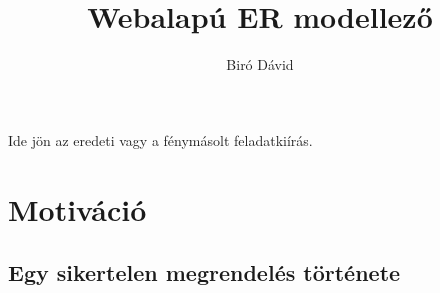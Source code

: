 \documentclass[a4paper,12pt,oneside]{report}
\title{Webalapú ER modellező}
\author{Biró Dávid}
\date{}
\begin{document}
\setcounter{chapter}{1}

\pagestyle{empty}

\newpage

\newpage
Ide jön az eredeti vagy a fénymásolt feladatkiírás.
\newpage

\newpage

\newpage

\sectionfont{\centering\large\sffamily}


\newpage

\newpage

\allsectionsfont{\sffamily\large} %
\subsectionfont{\sffamily\normalsize} %
\subsubsectionfont{\sffamily\normalsize} %


\renewcommand{\thefigure}{\arabic{figure}}

\setcounter{tocdepth}{3} %
\thispagestyle{empty}
\tableofcontents
\pagebreak

\setcounter{page}{1} %
\pagestyle{plain}
\fancyhead[C]{\rightmark}
\fancyfoot[R]{\thepage}
\section{Motiváció}
\subsection{Egy sikertelen megrendelés története}
\end{document}
